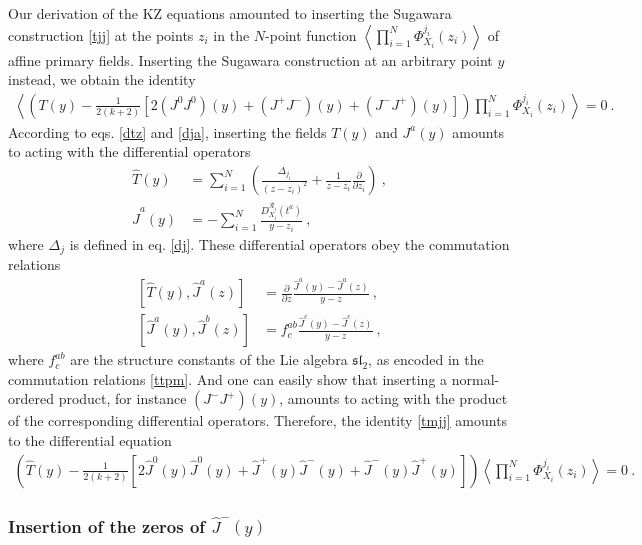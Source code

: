 \documentclass[12pt, a4paper, notitlepage, twoside]{report}
\numberwithin{equation}{section}
\theoremstyle{break}
\begin{document}
Our derivation of the KZ equations amounted to inserting the Sugawara construction \eqref{tjj}  at the points $z_i$ in the $N$-point function $\left\langle \prod_{i=1}^N \Phi^{j_i}_{X_i}(z_i)\right\rangle $ of affine primary fields.
Inserting the Sugawara construction at an arbitrary point $y$ instead, we obtain the identity
\begin{align}
 \left\langle \left(T(y)  - \frac{1}{2(k+2)}\left[ 2(J^0J^0)(y)+(J^+J^-)(y)+(J^-J^+)(y)\right]\right) \prod_{i=1}^N \Phi^{j_i}_{X_i}(z_i)\right\rangle = 0\ .
\label{tmjj}
\end{align}
According to eqs. \eqref{dtz} and \eqref{dja}, inserting the fields $T(y)$ and $J^a(y)$ amounts to acting with the differential operators 
\begin{align}
 \hat{T}(y) &= \sum_{i=1}^N \left(\frac{\Delta_{j_i}}{(z-z_i)^2} + \frac{1}{z-z_i}{\frac{\partial}{\partial z_i}}\right)\ ,
\label{tcy}
\\
 \hat{J}^a(y) &= - \sum_{i=1}^N \frac{D^{\mathcal{R}_i}_{X_i}(t^a)}{y-z_i}\ ,
\label{jay}
\end{align}
where $\Delta_j$ is defined in eq. \eqref{dj}.
These differential operators obey the commutation relations
\begin{align}
 \left[\hat{T}(y),\hat{J}^a(z)\right] &= {\frac{\partial}{\partial z}} \frac{\hat{J}^a(y)-\hat{J}^a(z)}{y-z}\ ,
\label{dtd}
\\
 \left[ \hat{J}^a(y),\hat{J}^b(z)\right] &= f^{ab}_c \frac{\hat{J}^c(y)-\hat{J}^c(z)}{y-z}\ ,
\label{ddd}
\end{align}
where $f^{ab}_c$ are the structure constants of the Lie algebra $\mathfrak{sl}_2$, as encoded in the commutation relations \eqref{ttpm}.
And one can easily show that inserting a normal-ordered product, for instance $(J^-J^+)(y)$, amounts to acting with the product of the corresponding differential operators.
Therefore, the identity \eqref{tmjj} amounts to the differential equation
\begin{align}
 \left(\hat{T}(y) -\frac{1}{2(k+2)}\left[ 2\hat{J}^0(y)\hat{J}^0(y) +\hat{J}^+(y)\hat{J}^-(y)+\hat{J}^-(y)\hat{J}^+(y)\right]\right) \left\langle \prod_{i=1}^N \Phi^{j_i}_{X_i}(z_i)\right\rangle=0\ .
 \label{refkz}
\end{align}

\subsubsection{Insertion of the zeros of $\hat{J}^-(y)$}
\end{document}
